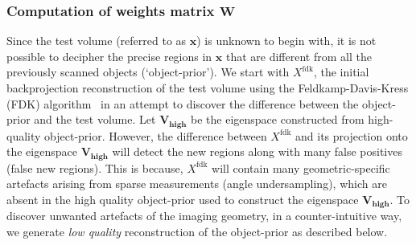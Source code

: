 \documentclass[journal]{IEEEtran}
\begin{document}
 \subsubsection{\textbf{Computation of weights matrix $\boldsymbol{W}$}}
Since the test volume (referred to as $\boldsymbol{x}$) is unknown to
begin with, it is not possible to decipher the precise regions in
$\boldsymbol{x}$ that are different from all the previously scanned
objects (`object-prior'). We start with $X^{\text{fdk}}$, the initial
backprojection reconstruction of the test volume using the
Feldkamp-Davis-Kress (FDK) algorithm~\cite{FDK} in an attempt to
discover the difference between the object-prior and the test
volume. Let $\boldsymbol{V_{\text{high}}}$ be the eigenspace
constructed from high-quality object-prior. However, the difference
between $X^{\text{fdk}}$ and its projection onto the eigenspace
$\boldsymbol{V_{\text{high}}}$ will detect the new regions along with
many false positives (false new regions). This is because,
$X^{\text{fdk}}$ will contain many geometric-specific artefacts
arising from sparse measurements (angle undersampling), which are
absent in the high quality object-prior used to construct the
eigenspace $\boldsymbol{V_{\text{high}}}$. To discover unwanted
artefacts of the imaging geometry, in a counter-intuitive way, we
generate \emph{low quality} reconstruction of the object-prior as
described below.
\vspace{2mm}
\end{document}
